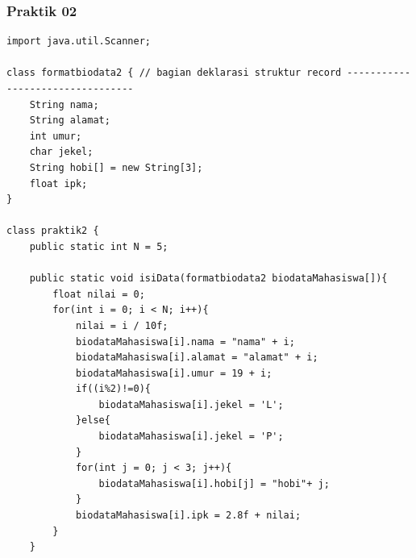 \documentclass[a4paper,12pt]{article}
\begin{document}
\subsubsection{Praktik 02}
\begin{lstlisting}
import java.util.Scanner;

class formatbiodata2 { // bagian deklarasi struktur record ---------------------------------
    String nama;
    String alamat;
    int umur;
    char jekel;
    String hobi[] = new String[3];
    float ipk;
}

class praktik2 {
    public static int N = 5;

    public static void isiData(formatbiodata2 biodataMahasiswa[]){
        float nilai = 0;
        for(int i = 0; i < N; i++){
            nilai = i / 10f;
            biodataMahasiswa[i].nama = "nama" + i;
            biodataMahasiswa[i].alamat = "alamat" + i;
            biodataMahasiswa[i].umur = 19 + i;
            if((i%2)!=0){
                biodataMahasiswa[i].jekel = 'L';
            }else{
                biodataMahasiswa[i].jekel = 'P';
            }
            for(int j = 0; j < 3; j++){
                biodataMahasiswa[i].hobi[j] = "hobi"+ j;
            }
            biodataMahasiswa[i].ipk = 2.8f + nilai;
        }
    }



\end{lstlisting}
\end{document}
